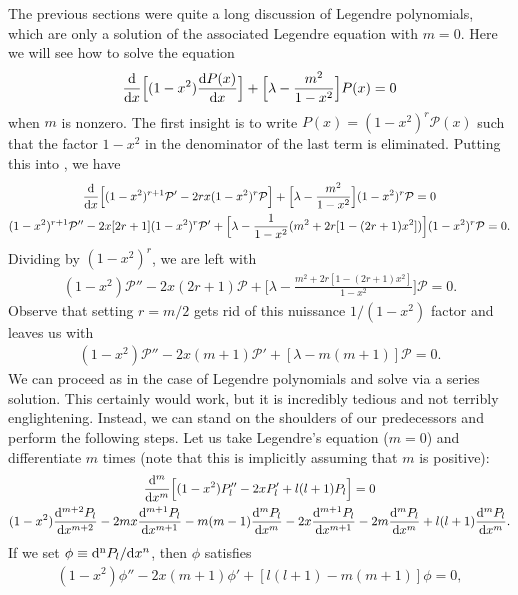The previous sections were quite a long discussion of Legendre polynomials, which are only a solution of the associated Legendre equation with $m=0$.
Here we will see how to solve the equation
\begin{eqnarray}
    \dv{x} \Big[ (1-x^2) \dv{P(x)}{x} \Big] + \Big[ \lambda - \frac{m^2}{1-x^2} \Big] P(x) = 0
\end{eqnarray}
when $m$ is nonzero.
The first insight is to write $P(x) = (1-x^2)^{r} \mathcal{P}(x)$ such that the factor $1-x^2$ in the denominator of the last term is eliminated.
Putting this into , we have
\begin{gather}
    \dv{x} \Big[ (1 - x^2)^{r+1} \mathcal{P}' - 2 r x(1 - x^2)^{r} \mathcal{P} \Big] + \Big[ \lambda - \frac{m^2}{1-x^2} \Big] (1-x^2)^{r} \mathcal{P} = 0 \nonumber \\
    (1-x^2)^{r+1}\mathcal{P}'' - 2x [ 2r + 1 ] (1-x^2)^{r} \mathcal{P}' + \Big[ \lambda - \frac{1}{1-x^2} ( m^2 + 2r[1 - (2r+1)x^2]) \Big] (1 - x^2)^{r} \mathcal{P} = 0
.\end{gather}
Dividing by $(1-x^2)^{r}$, we are left with
\begin{eqnarray}
    (1-x^2) \mathcal{P}'' - 2x(2r+1) \mathcal{P} + \Big[ \lambda - \frac{m^2 + 2r[ 1 - (2r + 1)x^2 ]}{1-x^2} \Big] \mathcal{P} = 0
.\end{eqnarray}
Observe that setting $r = m/2$ gets rid of this nuissance $1/(1-x^2)$ factor and leaves us with
\begin{eqnarray}
    (1-x^2) \mathcal{P}'' - 2x (m+1) \mathcal{P}' + [ \lambda - m(m+1) ] \mathcal{P} = 0
.\end{eqnarray}
We can proceed as in the case of Legendre polynomials and solve via a series solution.
This certainly would work, but it is incredibly tedious and not terribly englightening.
Instead, we can stand on the shoulders of our predecessors and perform the following steps.
Let us take Legendre's equation ($m = 0$) and differentiate $m$ times (note that this is implicitly assuming that $m$ is positive):
\begin{gather}
    \dv[m]{x} \Big[ (1-x^2) P_{l}'' - 2x P_{l}' + l(l+1)P_{l} \Big] = 0 \nonumber \\
    (1-x^2) \dv[m+2]{P_{l}}{x} - 2mx \dv[m+1]{P_{l}}{x} - m(m-1) \dv[m]{P_{l}}{x} - 2x \dv[m+1]{P_{l}}{x} - 2m \dv[m]{P_{l}}{x} + l(l+1) \dv[m]{P_{l}}{x}
.\end{gather}
If we set $\phi \equiv {\rm d^{n}} P_{l} / {\rm d}x^{n}$, then $\phi$ satisfies
\begin{eqnarray}
    (1-x^2) \phi'' - 2x(m+1) \phi' + [ l(l+1) - m(m+1) ] \phi = 0
,\end{eqnarray}
